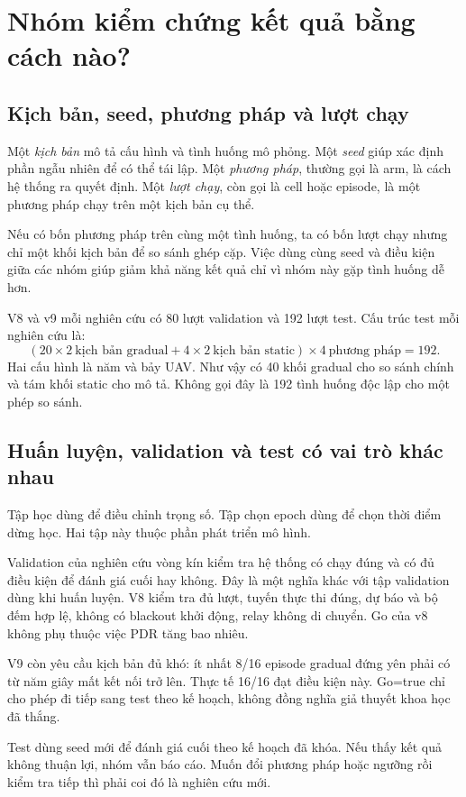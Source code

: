 \chapter{Nhóm kiểm chứng kết quả bằng cách nào?}
\section{Kịch bản, seed, phương pháp và lượt chạy}
Một \emph{kịch bản} mô tả cấu hình và tình huống mô phỏng. Một \emph{seed} giúp xác định phần ngẫu nhiên để có thể tái lập. Một \emph{phương pháp}, thường gọi là arm, là cách hệ thống ra quyết định. Một \emph{lượt chạy}, còn gọi là cell hoặc episode, là một phương pháp chạy trên một kịch bản cụ thể.

Nếu có bốn phương pháp trên cùng một tình huống, ta có bốn lượt chạy nhưng chỉ một khối kịch bản để so sánh ghép cặp. Việc dùng cùng seed và điều kiện giữa các nhóm giúp giảm khả năng kết quả chỉ vì nhóm này gặp tình huống dễ hơn.

V8 và v9 mỗi nghiên cứu có 80 lượt validation và 192 lượt test. Cấu trúc test mỗi nghiên cứu là:
\[
(20\times2\ \text{kịch bản gradual}+4\times2\ \text{kịch bản static})\times4\ \text{phương pháp}=192.
\]
Hai cấu hình là năm và bảy UAV. Như vậy có 40 khối gradual cho so sánh chính và tám khối static cho mô tả. Không gọi đây là 192 tình huống độc lập cho một phép so sánh.

\section{Huấn luyện, validation và test có vai trò khác nhau}
Tập học dùng để điều chỉnh trọng số. Tập chọn epoch dùng để chọn thời điểm dừng học. Hai tập này thuộc phần phát triển mô hình.

Validation của nghiên cứu vòng kín kiểm tra hệ thống có chạy đúng và có đủ điều kiện để đánh giá cuối hay không. Đây là một nghĩa khác với tập validation dùng khi huấn luyện. V8 kiểm tra đủ lượt, tuyến thực thi đúng, dự báo và bộ đếm hợp lệ, không có blackout khởi động, relay không di chuyển. Go của v8 không phụ thuộc việc PDR tăng bao nhiêu.

V9 còn yêu cầu kịch bản đủ khó: ít nhất 8/16 episode gradual đứng yên phải có từ năm giây mất kết nối trở lên. Thực tế 16/16 đạt điều kiện này. Go=true chỉ cho phép đi tiếp sang test theo kế hoạch, không đồng nghĩa giả thuyết khoa học đã thắng.

Test dùng seed mới để đánh giá cuối theo kế hoạch đã khóa. Nếu thấy kết quả không thuận lợi, nhóm vẫn báo cáo. Muốn đổi phương pháp hoặc ngưỡng rồi kiểm tra tiếp thì phải coi đó là nghiên cứu mới.

